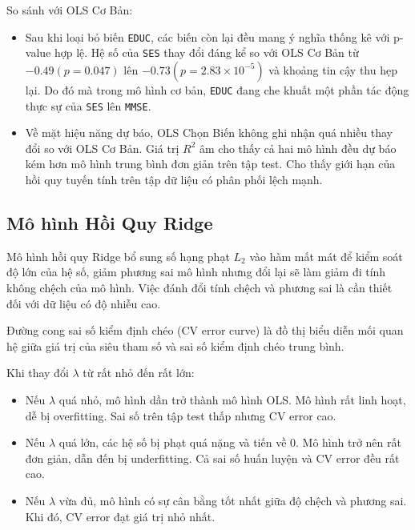 So sánh với OLS Cơ Bản:

\begin{itemize}[topsep=0pt, itemsep=2.5pt, leftmargin=1.5cm]
    \item Sau khi loại bỏ biến \texttt{EDUC}, các biến còn lại đều mang ý nghĩa thống kê với p-value hợp lệ. Hệ số của \texttt{SES} thay đổi đáng kể so với OLS Cơ Bản từ $-0.49 \left(p = 0.047\right)$ lên $-0.73 \left(p = 2.83 \times 10^{-5}\right)$ và khoảng tin cậy thu hẹp lại. Do đó mà trong mô hình cơ bản, \texttt{EDUC} đang che khuất một phần tác động thực sự của \texttt{SES} lên \texttt{MMSE}.
    \item Về mặt hiệu năng dự báo, OLS Chọn Biến không ghi nhận quá nhiều thay đổi so với OLS Cơ Bản. Giá trị $R^2$ âm cho thấy cả hai mô hình đều dự báo kém hơn mô hình trung bình đơn giản trên tập test. Cho thấy giới hạn của hồi quy tuyến tính trên tập dữ liệu có phân phối lệch mạnh.
\end{itemize}

\subsection{Mô hình Hồi Quy Ridge}

Mô hình hồi quy Ridge bổ sung số hạng phạt $L_2$ vào hàm mất mát để kiểm soát độ lớn của hệ số, giảm phương sai mô hình nhưng đổi lại sẽ làm giảm đi tính không chệch của mô hình. Việc đánh đổi tính chệch và phương sai là cần thiết đối với dữ liệu có độ nhiễu cao.

Đường cong sai số kiểm định chéo (CV error curve) là đồ thị biểu diễn mối quan hệ giữa giá trị của siêu tham số và sai số kiểm định chéo trung bình.

Khi thay đổi $\lambda$ từ rất nhỏ đến rất lớn:

\begin{itemize}[topsep=0pt, itemsep=2.5pt, leftmargin=1.5cm]
    \item Nếu $\lambda$ quá nhỏ, mô hình dần trở thành mô hình OLS. Mô hình rất linh hoạt, dễ bị overfitting. Sai số trên tập test thấp nhưng CV error cao.
    \item Nếu $\lambda$ quá lớn, các hệ số bị phạt quá nặng và tiến về 0. Mô hình trở nên rất đơn giản, dẫn đến bị underfitting. Cả sai số huấn luyện và CV error đều rất cao.
    \item Nếu $\lambda$ vừa đủ, mô hình có sự cân bằng tốt nhất giữa độ chệch và phương sai. Khi đó, CV error đạt giá trị nhỏ nhất.
\end{itemize}

